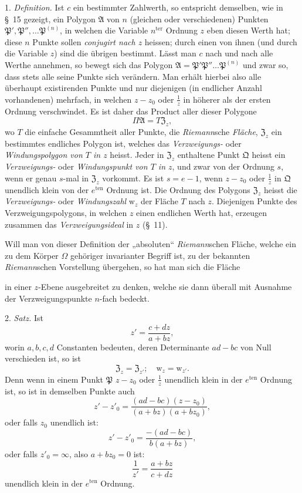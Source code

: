 \documentclass{article}
\begin{document}
1. \emph{Definition.} Ist $c$ ein bestimmter Zahlwerth, so entspricht demselben, wie in §~15 gezeigt, ein Polygon $\mathfrak{A}$ von $n$ (gleichen oder verschiedenen) Punkten $\mathfrak{P}', \mathfrak{P}'', \ldots \mathfrak{P}^{(n)}$, in welchen die Variable $n^{\text{ter}}$ Ordnung $z$ eben diesen Werth hat; diese $n$ Punkte sollen \emph{conjugirt nach $z$} heissen; durch einen von ihnen (und durch die Variable $z$) sind die übrigen bestimmt. Lässt man $c$ nach und nach alle Werthe annehmen, so bewegt sich das Polygon $\mathfrak{A} = \mathfrak{P}'\mathfrak{P}''\ldots\mathfrak{P}^{(n)}$ und zwar so, dass stets alle seine Punkte sich verändern. Man erhält hierbei also alle überhaupt existirenden Punkte und nur diejenigen (in endlicher Anzahl vorhandenen) mehrfach, in welchen $z - z_{0}$ oder $\frac{1}{z}$ in höherer als der ersten Ordnung verschwindet. Es ist daher das Product aller dieser Polygone
\[ \Pi\mathfrak{A} = T\mathfrak{Z}_{z}, \]
wo $T$ die einfache Gesammtheit aller Punkte, die \emph{Riemann}sche \emph{Fläche}, $\mathfrak{Z}_{z}$ ein bestimmtes endliches Polygon ist, welches das \emph{Verzweigungs-} oder \emph{Windungspolygon von $T$ in $z$} heisst. Jeder in $\mathfrak{Z}_{z}$ enthaltene Punkt $\mathfrak{Q}$ heisst ein \emph{Verzweigungs-} oder \emph{Windungspunkt von $T$ in $z$}, und zwar von der Ordnung $s$, wenn er genau $s$-mal in $\mathfrak{Z}_{z}$ vorkommt. Es ist $s = e-1$, wenn $z - z_{0}$ oder $\frac{1}{z}$ in $\mathfrak{Q}$ unendlich klein von der $e^{\text{ten}}$ Ordnung ist. Die Ordnung des Polygons $\mathfrak{Z}_{z}$ heisst die \emph{Verzweigungs-} oder \emph{Windungszahl} $\mathrm{w}_{z}$ der Fläche $T$ nach $z$. Diejenigen Punkte des Verzweigungspolygons, in welchen $z$ einen endlichen Werth hat, erzeugen zusammen das \emph{Verzweigungsideal} in $z$ (§~11).

Will man von dieser Definition der „absoluten“ \emph{Riemann}schen Fläche, welche ein zu dem Körper $\Omega$ gehöriger invarianter Begriff ist, zu der bekannten \emph{Riemann}schen Vorstellung übergehen, so hat man sich die Fläche

in einer $z$-Ebene ausgebreitet zu denken, welche sie dann überall mit Ausnahme der Verzweigungspunkte $n$-fach bedeckt.

2. \emph{Satz.} Ist
\[ z' = \frac{c+dz}{a+bz}, \]
worin $a, b, c, d$ Constanten bedeuten, deren Determinante $ad-bc$ von Null verschieden ist, so ist
\[ \mathfrak{Z}_{z} = \mathfrak{Z}_{z'}; \quad \mathrm{w}_{z} = \mathrm{w}_{z'}. \]
Denn wenn in einem Punkt $\mathfrak{P}$ $z - z_{0}$ oder $\frac{1}{z}$ unendlich klein in der $e^{\text{ten}}$ Ordnung ist, so ist in demselben Punkte auch
\[ z' - z'_{0} = \frac{(ad-bc)(z-z_{0})}{(a+bz)(a+bz_{0})}, \]
oder falls $z_{0}$ unendlich ist:
\[ z' - z'_{0} = \frac{-(ad-bc)}{b(a+bz)}, \]
oder falls $z'_{0} = \infty$, also $a+bz_{0} = 0$ ist:
\[ \frac{1}{z'} = \frac{a+bz}{c+dz} \]
unendlich klein in der $e^{\text{ten}}$ Ordnung.
\end{document}
